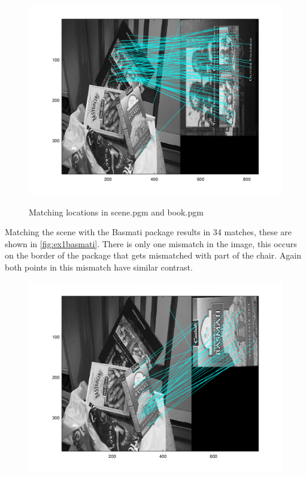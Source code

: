 \documentclass[a4paper]{article}
\begin{document}
\begin{figure}[h]
	\centering
	\includegraphics[width=.7\textwidth]{ex1match}
	\label{fig:ex1match}
	\caption{Matching locations in scene.pgm and book.pgm}
\end{figure}

Matching the scene with the Basmati package results in 34 matches, these are shown in \autoref{fig:ex1basmati}. There is only one mismatch in the image, this occurs on the border of the package that gets mismatched with part of the chair. Again both points in this mismatch have similar contrast.

\begin{figure}[h]
	\centering
	\includegraphics[width=.7\textwidth]{ex1basmati}
	\label{fig:ex1basmati}
	\caption{}
\end{figure}




\end{document}
